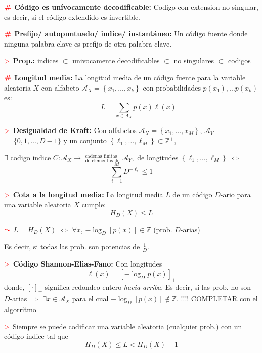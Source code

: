 \documentclass[%
 reprint,
 amsmath,amssymb,
 aps,
]{revtex4-1}
\begin{document}
\textbf{$\color{red}{\textbf{\#}}$ Código es unívocamente decodificable:}
Codigo con extension no singular, es decir, si el código extendido es invertible.

\textbf{$\color{red}{\textbf{\#}}$ Prefijo/ autopuntuado/ indice/ instantáneo:} 
Un código fuente donde ninguna palabra clave es prefijo de otra palabra clave.

\textbf{$\textcolor{red}{\mathbf{>}}$ Prop.:} 
indices $\subset$ univocamente decodificables $\subset$ no singulares $\subset$ codigos 

\textbf{$\color{red}{\textbf{\#}}$ Longitud media:} 
La longitud media de un código fuente para la variable aleatoria $X$ con alfabeto $\mathcal{A}_X=\left\{x_{1}, \ldots, x_{k}\right\} \text { con probabilidades } p\left(x_{1}\right), \ldots p(x_{k})$ es:
$$
\qquad L=\sum_{x \in A_{X}} p(x) \ell(x)
$$

\textbf{$\textcolor{red}{\mathbf{>}}$ Desigualdad de Kraft:} 
Con alfabetos 
$\mathcal{A}_{X}=\left\{x_{1}, \ldots, x_{M}\right\}$, $\mathcal{A}_{Y}$
$= \{0,1, \ldots, D-1\} $ 
y un conjunto $\left\{\ell_{1}, \ldots, \ell_{M}\right\} \subset \mathbb{Z}^+$, 

$\exists$ codigo indice $C: \mathcal{A}_{X} \rightarrow$ $^\text{cadenas finitas}
_\text{de elementos de}$
$\mathcal{A}_{Y},$
de longitudes $\left\{\ell_{1}, \ldots, \ell_{M}\right\}$ $\Leftrightarrow$
$$
\sum_{i=1}^{M} D^{-\ell_{i}} \leq 1
$$

\textbf{$\textcolor{red}{\mathbf{>}}$ Cota a la longitud media:} 
La longitud media $L$ de un código $D$-ario para una variable aleatoria $X$ cumple: 
$$H_D(X)\leq L $$

\textbf{$\textcolor{red}{\color{red}{\boldsymbol{\sim}}}$} 
$L = H_D(X)$ $\Leftrightarrow$ 
$\forall x$, $-\log _{D}[p(x)] \in \mathbb{Z}$ (prob. $D$-arias)

Es decir, si todas las prob. son potencias de $\frac{1}{D}$.

\textbf{$\textcolor{red}{\mathbf{>}}$ Código Shannon-Elias-Fano:}
Con longitudes
$$
\ell(x)=\left[-\log _{D} p(x)\right]_{+}
$$
donde, $[\cdot]_{+}$ significa redondeo entero \textit{hacia arriba}. Es decir, si las prob. no son $D$-arias $\Rightarrow$ $\exists x \in \mathcal{A}_{X}$ para el cual $-\log _{D}[p(x)] \notin \mathbb{Z}$. !!!! COMPLETAR con el algorritmo

\textbf{$\textcolor{red}{\mathbf{>}}$} 
Siempre se puede codificar una variable aleatoria (cualquier prob.) con un código indice tal que
$$
H_{D}(X) \leq L<H_{D}(X)+1
$$
\end{document}

